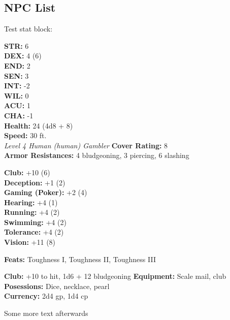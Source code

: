 \subsection{NPC List}

Test stat block:

{
    \textbf{STR:} 6 \\
    \textbf{DEX:} 4 (6) \\
    \textbf{END:} 2 \\
    \textbf{SEN:} 3 \\
}
{
    \textbf{INT:} -2 \\
    \textbf{WIL:} 0 \\
    \textbf{ACU:} 1 \\
    \textbf{CHA:} -1 \\
}
{
    \textbf{Health:} 24 (4d8 + 8) \\
    \textbf{Speed:} 30 ft. \\
    \textit{Level 4 Human (human) Gambler}
}
{
    \textbf{Cover Rating:} 8 \\
    \textbf{Armor Resistances:} 4 bludgeoning, 3 piercing, 6 slashing
}
{
    \begin{multicols}{2}
        \textbf{Club:} +10 (6) \\
        \textbf{Deception:} +1 (2) \\
        \textbf{Gaming (Poker):} +2 (4) \\
        \textbf{Hearing:} +4 (1) \\
        \textbf{Running:} +4 (2) \\
        \textbf{Swimming:} +4 (2) \\
        \textbf{Tolerance:} +4 (2) \\
        \textbf{Vision:} +11 (8)
    \end{multicols}
    \textbf{Feats:} Toughness I, Toughness II, Toughness III
}
{
    \textbf{Club:} +10 to hit, 1d6 + 12 bludgeoning
}
{
    \textbf{Equipment:} Scale mail, club \\
    \textbf{Posessions:} Dice, necklace, pearl \\
    \textbf{Currency:} 2d4 gp, 1d4 cp
}

Some more text afterwards
